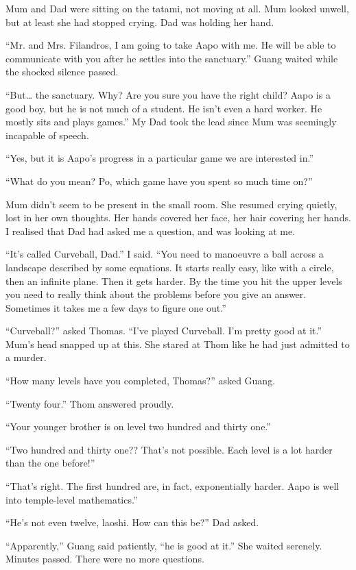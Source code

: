 Mum and Dad were sitting on the tatami, not moving at all. Mum looked unwell, but at least she had stopped crying. Dad was holding her hand.

``Mr. and Mrs. Filandros, I am going to take Aapo with me. He will be able to communicate with you after he settles into the sanctuary.'' Guang waited while the shocked silence passed.

``But\ldots{} the sanctuary. Why? Are you sure you have the right child? Aapo is a good boy, but he is not much of a student. He isn't even a hard worker. He mostly sits and plays games.'' My Dad took the lead since Mum was seemingly incapable of speech.

``Yes, but it is Aapo's progress in a particular game we are interested in.''

``What do you mean? Po, which game have you spent so much time on?''

Mum didn't seem to be present in the small room. She resumed crying quietly, lost in her own thoughts. Her hands covered her face, her hair covering her hands. I realised that Dad had asked me a question, and was looking at me.

``It's called Curveball, Dad.'' I said. ``You need to manoeuvre a ball across a landscape described by some equations. It starts really easy, like with a circle, then an infinite plane. Then it gets harder. By the time you hit the upper levels you need to really think about the problems before you give an answer. Sometimes it takes me a few days to figure one out.''

``Curveball?'' asked Thomas. ``I've played Curveball. I'm pretty good at it.'' Mum's head snapped up at this. She stared at Thom like he had just admitted to a murder.

``How many levels have you completed, Thomas?'' asked Guang.

``Twenty four.'' Thom answered proudly.

``Your younger brother is on level two hundred and thirty one.''

``Two hundred and thirty one?? That's not possible. Each level is a lot harder than the one before!''

``That's right. The first hundred are, in fact, exponentially harder. Aapo is well into temple-level mathematics.''

``He's not even twelve, laoshi. How can this be?'' Dad asked.

``Apparently,'' Guang said patiently, ``he is good at it.'' She waited serenely. Minutes passed. There were no more questions.

